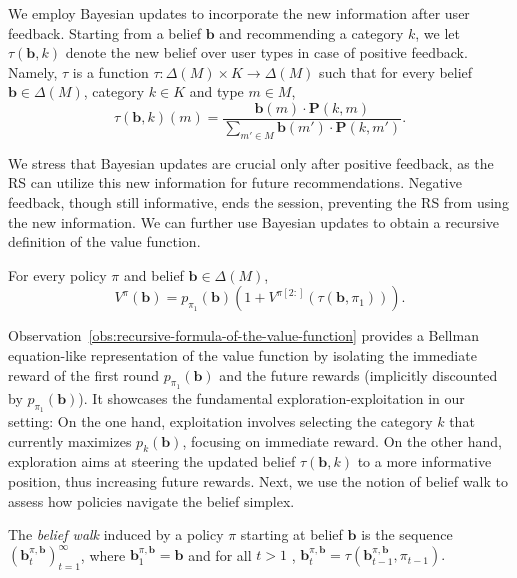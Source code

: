 We employ Bayesian updates to incorporate the new information after user feedback. Starting from a belief $\bm b$ and recommending a category $k$, we let $\tau(\bm{b}, k)$ denote the new belief over user types in case of positive feedback. Namely, $\tau$ is a function $\tau: \Delta(M) \times K \to \Delta(M)$ such that for every belief $\bm{b} \in \Delta(M)$, category $k \in K$ and type $m \in M$,
\begin{equation}\label{eq:bayesian update}
    \tau(\bm{b}, k)(m) =  \frac{\bm{b}(m) \cdot \bm{P}(k,m)}{\sum_{m' \in M} \bm{b}(m') \cdot \bm{P}(k,m')}.
\end{equation}

We stress that Bayesian updates are crucial only after positive feedback, as the RS can utilize this new information for future recommendations. Negative feedback, though still informative, ends the session, preventing the RS from using the new information. We can further use Bayesian updates to obtain a recursive definition of the value function.
\begin{observation}
    \label{obs:recursive-formula-of-the-value-function}
    For every policy $\pi$ and belief $\bm{b} \in \Delta(M)$,
    \[
        V^{\pi}(\bm{b}) = p_{\pi_1}(\bm{b}) \left( 1 + V^{\pi[2:]}(\tau(\bm{b}, \pi_1)) \right).
    \]
\end{observation}
Observation~\ref{obs:recursive-formula-of-the-value-function} provides a Bellman equation-like representation of the value function by isolating the immediate reward of the first round $p_{\pi_1}(\bm{b})$ and the future rewards (implicitly discounted by $p_{\pi_1}(\bm{b})$). It showcases the fundamental exploration-exploitation in our setting: On the one hand, exploitation involves selecting the category $k$ that currently maximizes $p_{k}(\bm{b})$, focusing on immediate reward. On the other hand, exploration aims at steering the updated belief $\tau(\bm{b}, k)$ to a more informative position, thus increasing future rewards. Next, we use the notion of belief walk to assess how policies navigate the belief simplex.

\begin{definition}
    The \emph{belief walk} induced by a policy $\pi$ starting at belief $\bm{b}$ is the sequence $( \bm{b}^{\pi, \bm{b}}_t)_{t=1}^{\infty}$, where $\bm{b}^{\pi, \bm{b}}_1 = \bm{b}$ and for all $t > 1$ , $\bm{b}^{\pi, \bm{b}}_t = \tau(\bm{b}^{\pi, \bm{b}}_{t-1}, \pi_{t-1}).$
\end{definition}

